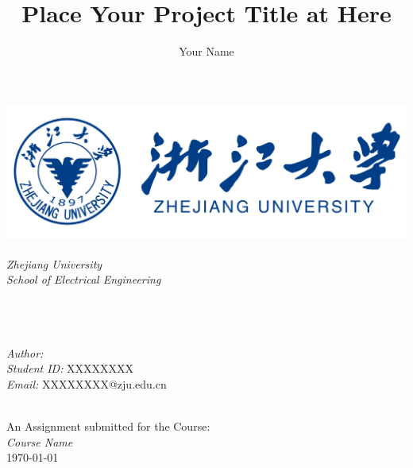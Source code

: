 \documentclass{article}
\begin{document}

\title{Place Your Project Title at Here}
\author{\textup{Your Name}}

\begin{titlepage}
	\centering
	\includegraphics[width=0.8\linewidth]{./fig/ZJU logo.png}\\[1cm]

	\center
	\quad\\[1.5cm]

	\textsl{\Large Zhejiang University}\\[0.5cm] 
	\textsl{\large School of Electrical Engineering}\\[0.5cm] 
	
	\makeatletter
	\HRule{2.0pt} \\[0.5cm]
	{\huge \bfseries \@title} \\[0.5cm] 
	\HRule{2.0pt} \\[1.5cm]

	\begin{minipage}{0.4\textwidth}
		\begin{flushleft} 
			\large \emph{Author:} \@author \\
            \large \emph{Student ID:} \textup{XXXXXXXX} \\
            \large \emph{Email:} \textup{XXXXXXXX@zju.edu.cn}
		\end{flushleft}
	\end{minipage}\\[4cm]

	\makeatother
	{\large An Assignment submitted for the Course:}\\[0.5cm]
	{\large \emph{Course Name}}\\[0.5cm]
	{\large \today}\\[2cm] 
	\vfill 
\end{titlepage}
\newpage

\end{document}
